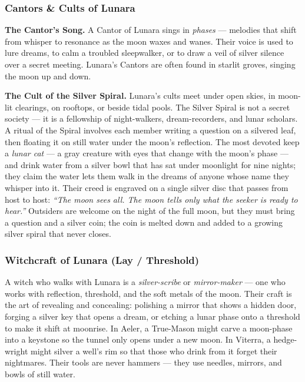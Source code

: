 \subsubsection*{Cantors \& Cults of Lunara}

\textbf{The Cantor's Song.} A Cantor of Lunara sings in \textit{phases} --- melodies that shift from whisper to resonance as the moon waxes and wanes. Their voice is used to lure dreams, to calm a troubled sleepwalker, or to draw a veil of silver silence over a secret meeting. Lunara's Cantors are often found in starlit groves, singing the moon up and down.

\textbf{The Cult of the Silver Spiral.} Lunara's cults meet under open skies, in moon-lit clearings, on rooftops, or beside tidal pools. The Silver Spiral is not a secret society --- it is a fellowship of night-walkers, dream-recorders, and lunar scholars. A ritual of the Spiral involves each member writing a question on a silvered leaf, then floating it on still water under the moon's reflection. The most devoted keep a \textit{lunar cat} --- a gray creature with eyes that change with the moon's phase --- and drink water from a silver bowl that has sat under moonlight for nine nights; they claim the water lets them walk in the dreams of anyone whose name they whisper into it. Their creed is engraved on a single silver disc that passes from host to host: \textit{``The moon sees all. The moon tells only what the seeker is ready to hear.''} Outsiders are welcome on the night of the full moon, but they must bring a question and a silver coin; the coin is melted down and added to a growing silver spiral that never closes.

\subsubsection*{Witchcraft of Lunara (Lay / Threshold)}

A witch who walks with Lunara is a \textit{silver-scribe} or \textit{mirror-maker} --- one who works with reflection, threshold, and the soft metals of the moon. Their craft is the art of revealing and concealing: polishing a mirror that shows a hidden door, forging a silver key that opens a dream, or etching a lunar phase onto a threshold to make it shift at moonrise. In Aeler, a True-Mason might carve a moon-phase into a keystone so the tunnel only opens under a new moon. In Viterra, a hedge-wright might silver a well's rim so that those who drink from it forget their nightmares. Their tools are never hammers --- they use needles, mirrors, and bowls of still water.

